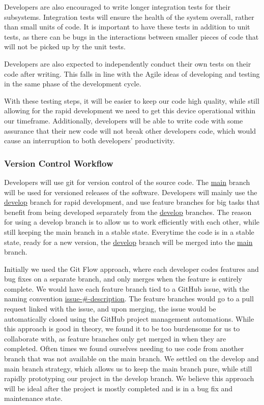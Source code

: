 Developers are also encouraged to write longer integration tests for their subsystems.
Integration tests will ensure the health of the system overall, rather than small units of
code. It is important to have these tests in addition to unit tests, as there can be bugs
in the interactions between smaller pieces of code that will not be picked up by the unit
tests.

Developers are also expected to independently conduct their own tests on their code after
writing. This falls in line with the Agile ideas of developing and testing in the same
phase of the development cycle.

With these testing steps, it will be easier to keep our code high quality, while still
allowing for the rapid development we need to get this device operational within our
timeframe. Additionally, developers will be able to write code with some assurance that
their new code will not break other developers code, which would cause an interruption to
both developers' productivity.

\subsubsection{Version Control Workflow}

Developers will use git for version control of the source code. The \url{main} branch
will be used for versioned releases of the software. Developers will mainly use the
\url{develop} branch for rapid development, and use feature branches for big tasks that
benefit from being developed separately from the \url{develop} branches. The reason for
using a develop branch is to allow us to work efficiently with each other, while still
keeping the main branch in a stable state. Everytime the code is in a stable state, ready
for a new version, the \url{develop} branch will be merged into the \url{main} branch.

Initially we used the Git Flow approach, where each developer codes features and bug fixes
on a separate branch, and only merges when the feature is entirely complete. We would have
each feature branch tied to a GitHub issue, with the naming convention
\url{issue-\#-description}. The feature branches would go to a pull request linked with
the issue, and upon merging, the issue would be automatically closed using the GitHub
project management automations. While this approach is good in theory, we found it to be
too burdensome for us to collaborate with, as feature branches only get merged in when
they are completed. Often times we found ourselves needing to use code from another branch
that was not available on the main branch. We settled on the develop and main branch
strategy, which allows us to keep the main branch pure, while still rapidly prototyping
our project in the develop branch. We believe this approach will be ideal after the
project is mostly completed and is in a bug fix and maintenance state.

